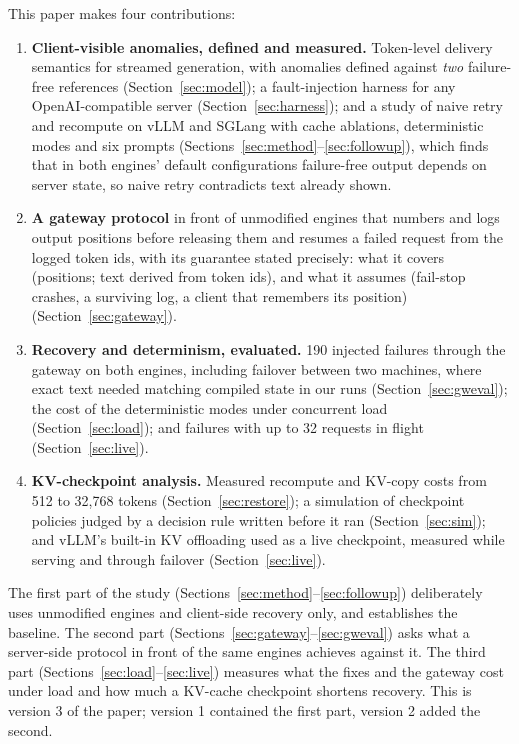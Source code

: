 \documentclass[10pt,twocolumn]{article}
\begin{document}
This paper makes four contributions:
\begin{enumerate}
  \item \textbf{Client-visible anomalies, defined and measured.} Token-level
    delivery semantics for streamed generation, with anomalies defined
    against \emph{two} failure-free references (Section~\ref{sec:model}); a
    fault-injection harness for any OpenAI-compatible server
    (Section~\ref{sec:harness}); and a study of naive retry and recompute on
    vLLM and SGLang with cache ablations, deterministic modes and six prompts
    (Sections~\ref{sec:method}--\ref{sec:followup}), which finds that in both
    engines' default configurations failure-free output depends on server
    state, so naive retry contradicts text already shown.
  \item \textbf{A gateway protocol} in front of unmodified engines that
    numbers and logs output positions before releasing them and resumes a
    failed request from the logged token ids, with its guarantee stated
    precisely: what it covers (positions; text derived from token ids), and
    what it assumes (fail-stop crashes, a surviving log, a client that
    remembers its position) (Section~\ref{sec:gateway}).
  \item \textbf{Recovery and determinism, evaluated.} 190 injected failures
    through the gateway on both engines, including failover between two
    machines, where exact text needed matching compiled state in our runs
    (Section~\ref{sec:gweval}); the cost of the deterministic modes under
    concurrent load (Section~\ref{sec:load}); and failures with up to 32
    requests in flight (Section~\ref{sec:live}).
  \item \textbf{KV-checkpoint analysis.} Measured recompute and KV-copy costs
    from 512 to 32{,}768 tokens (Section~\ref{sec:restore}); a simulation of
    checkpoint policies judged by a decision rule written before it ran
    (Section~\ref{sec:sim}); and vLLM's built-in KV offloading used as a live
    checkpoint, measured while serving and through failover
    (Section~\ref{sec:live}).
\end{enumerate}

The first part of the study (Sections~\ref{sec:method}--\ref{sec:followup})
deliberately uses unmodified engines and client-side recovery only, and
establishes the baseline. The second part
(Sections~\ref{sec:gateway}--\ref{sec:gweval}) asks what a server-side
protocol in front of the same engines achieves against it. The third part
(Sections~\ref{sec:load}--\ref{sec:live}) measures what the fixes and the
gateway cost under load and how much a KV-cache checkpoint shortens
recovery. This is version 3 of the paper; version 1 contained the first part,
version 2 added the second.
\end{document}
